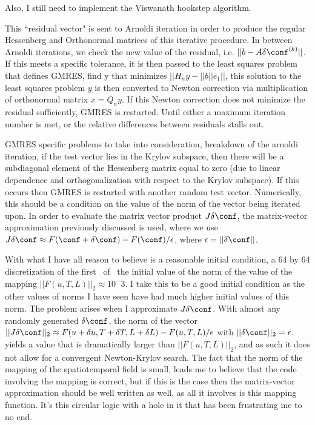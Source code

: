 

Also, I still need to implement the Viswanath hookstep algorithm.

This ``residual vector" is sent to Arnoldi iteration in order to produce the
regular Hessenberg and Orthonormal matrices of this iterative procedure. In
between Arnoldi iterations, we check the new value of the residual, i.e.
$||b-A\delta\conf^{(k)}||$. If this meets a specific tolerance, it is then
passed to the least squares problem that defines GMRES, find
y that minimizes $||H_n y - ||b|| e_1||$, this solution to the least squares
problem $y$ is then converted to Newton correction via multiplication of
orthonormal matrix $x = Q_n y$. If this Newton correction does not minimize
the residual sufficiently, GMRES is restarted. Until either a maximum
iteration number is met, or the relative differences between residuals stalls
out.

GMRES specific problems to take into consideration,
breakdown of the arnoldi iteration, if the test vector lies in the Krylov subspace,
then there will be a subdiagonal element of the
 Hessenberg matrix equal to zero (due to linear
  dependence and orthogonalization with
respect to the Krylov subspace). If this occurs then
 GMRES is restarted with another random test vector.
Numerically, this should be a condition on the value of the norm
of the vector being iterated upon.
In order to evaluate the matrix vector product $J \delta \conf$, the matrix-vector approximation previously discussed is used, where
we use $J\delta \conf \approx F(\conf +\delta \conf) - F(\conf) / \epsilon$, where $\epsilon = ||\delta \conf||$.


With what I have all reason to believe is a reasonable initial condition, a 64 by 64 discretization
of the first \ppo\ of \KS\ the initial value of the norm of the value of the mapping
$||F(u,T,L)||_2 \approx 10^-3$. I take this to be a good initial condition as the other values of norms
I have seen have had much higher initial values of this norm. The problem arises when I approximate
$J \delta \conf$. With almost any randomly generated $\delta \conf$, the norm of the vector $||J \delta \conf||_2
\approx F(u+\delta u, T + \delta T, L + \delta L) - F(u,T,L) / \epsilon $ with $||\delta \conf||_2 = \epsilon$.
yields a value that is dramatically larger than $||F(u,T,L)||_2$, and as such it does not allow for a convergent
Newton-Krylov search. The fact that the norm of the mapping of the spatiotemporal field is small, leads me to
believe that the code involving the mapping is correct, but if this is the case then the matrix-vector approximation
should be well written as well, as all it involves is this mapping function. It's this circular logic
with a hole in it that has been frustrating me to no end.

